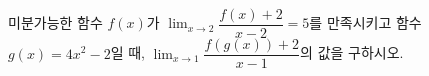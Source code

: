 미분가능한 함수 $f(x)$가 $\displaystyle\lim_{x\to 2}\dfrac{f(x)+2}{x-2}=5$를 만족시키고 함수 $g(x)=4x^2-2$일 때, $\displaystyle\lim_{x\to 1}\dfrac{f(g(x))+2}{x-1}$의 값을 구하시오.
